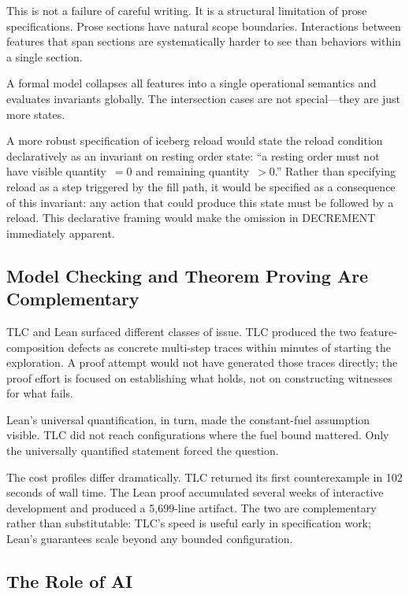 \documentclass[11pt,a4paper]{article}
\begin{document}
This is not a failure of careful writing. It is a structural limitation
of prose specifications. Prose sections have natural scope boundaries.
Interactions between features that span sections are systematically
harder to see than behaviors within a single section.

A formal model collapses all features into a single operational
semantics and evaluates invariants globally. The intersection cases are
not special---they are just more states.

A more robust specification of iceberg reload would state the reload
condition declaratively as an invariant on resting order state:
``a resting order must not have visible quantity~$= 0$ and remaining
quantity~$> 0$.'' Rather than specifying reload as a step triggered by
the fill path, it would be specified as a consequence of this invariant:
any action that could produce this state must be followed by a reload.
This declarative framing would make the omission in DECREMENT
immediately apparent.

\subsection{Model Checking and Theorem Proving Are Complementary}
\label{sec:lessons-complementary}

TLC and Lean surfaced different classes of issue. TLC produced the two
feature-composition defects as concrete multi-step traces within minutes
of starting the exploration. A proof attempt would not have generated
those traces directly; the proof effort is focused on establishing what
holds, not on constructing witnesses for what fails.

Lean's universal quantification, in turn, made the constant-fuel
assumption visible. TLC did not reach configurations where the fuel
bound mattered. Only the universally quantified statement forced the
question.

The cost profiles differ dramatically. TLC returned its first
counterexample in 102 seconds of wall time. The Lean proof accumulated
several weeks of interactive development and produced a 5{,}699-line
artifact. The two are complementary rather than substitutable: TLC's
speed is useful early in specification work; Lean's guarantees scale
beyond any bounded configuration.

\subsection{The Role of AI}
\label{sec:lessons-ai}
\end{document}
